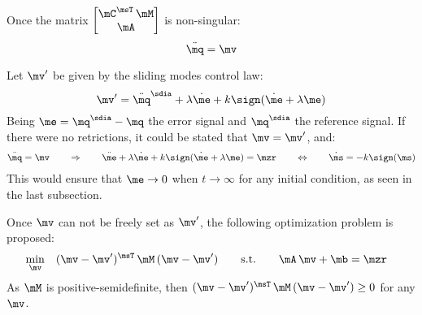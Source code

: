 Once the matrix $\begin{bmatrix} \mC^\msT \, \mM \\ \mA \end{bmatrix}$ is non-singular:
\begin{equation} \label{eq:ClosedLoopV}
\ddot{\mq} = \mv
\end{equation}

Let $\mv'$ be given by the sliding modes control law:
\begin{equation} \label{eq:SMControlowLasV1'}
\mv' = \ddot{\mq}^\sdia + \lambda \dot{\me} + k \sign (\dot{\me} + \lambda \me)
\end{equation}
Being $ \me = \mq^\sdia - \mq $ the error signal and $\mq^\sdia$ the reference signal. If there were no retrictions, it could be stated that $ \mv = \mv' $, and:
\begin{align*}
	\ddot{\mq} = \mv \qquad \Rightarrow \qquad \ddot{\me} + \lambda \dot{\me} + k \sign (\dot{\me} + \lambda \me) = \mzr 
	\qquad \Leftrightarrow \qquad \dot{\ms} = - k \sign(\ms)
\end{align*}
This would ensure that $\me \rightarrow 0$ when $t \rightarrow \infty$ for any initial condition, as seen in the last subsection. 

Once $\mv$ can not be freely set as $\mv'$, the following optimization problem is proposed:
\begin{align} \label{eq:Optimization}
& 	\min_{\mv} \quad (\mv - \mv')^\msT \, \mM \, (\mv - \mv') 
	\qquad \text{s.t.} \qquad \mA \, \mv + \mb = \mzr
\end{align}
As $\mM$ is positive-semidefinite, then $(\mv - \mv')^\msT \, \mM \, (\mv - \mv') \geq 0 $ for any $\mv$.

